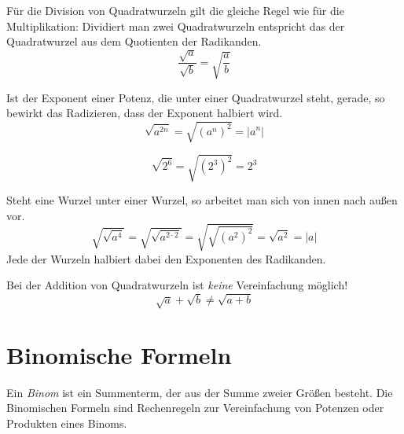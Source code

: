 \begin{regel}
 Für die Division von Quadratwurzeln gilt die gleiche Regel wie für die Multiplikation: Dividiert man zwei Quadratwurzeln  entspricht das der Quadratwurzel aus dem Quotienten der Radikanden.
 \begin{equation*}
  \frac{\sqrt{a}}{\sqrt{b}} = \sqrt{\frac{a}{b}}
 \end{equation*}
\end{regel}

\begin{folg}
 Ist der Exponent einer Potenz, die unter einer Quadratwurzel steht, gerade, so bewirkt das Radizieren, dass der Exponent halbiert wird.
 \begin{equation*}
  \sqrt{a^{2n}} = \sqrt{\left(a^n\right)^2} = |a^n|
 \end{equation*}
\end{folg}

\begin{bsp}
 \begin{equation*}
  \sqrt{2^6} = \sqrt{\left(2^3\right)^2} = 2^3
 \end{equation*}

\end{bsp}


\begin{regel}
 Steht eine Wurzel unter einer Wurzel, so arbeitet man sich von innen nach außen vor.
 \begin{equation*}
  \sqrt{\sqrt{a^4}}=\sqrt{\sqrt{a^{2\cdot2}}} = \sqrt{\sqrt{\left(a^2\right)^2}} = \sqrt{a^2} = |a|
  \end{equation*}
 Jede der Wurzeln halbiert dabei den Exponenten des Radikanden.
\end{regel}

\begin{regel}
 Bei der Addition von Quadratwurzeln ist \emph{keine} Vereinfachung möglich!
 \begin{equation*}
  \sqrt{a}+\sqrt{b} \ne \sqrt{a+b}
 \end{equation*}
\end{regel}

\section{Binomische Formeln}
Ein \emph{Binom} ist ein Summenterm, der aus der Summe zweier Größen besteht. Die Binomischen Formeln sind Rechenregeln zur Vereinfachung von Potenzen oder Produkten eines Binoms.

